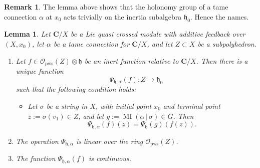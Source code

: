 \documentclass[10pt, a4paper]{amsart}
\newtheorem{lem}[equation]{Lemma}
\theoremstyle{definition}
\newtheorem{rem}[equation]{Remark}
\numberwithin{equation}{section}
\newcommand{\opn}{\operatorname}
\newcommand{\mfrak}[1]{\mathfrak{#1}}
\newcommand{\mcal}[1]{\mathcal{#1}}
\newcommand{\mbf}[1]{\mathbf{#1}}
\newcommand{\mrm}[1]{\mathrm{#1}}
\renewcommand{\vert}{\, | \,}
\newcommand{\h}{\mfrak{h}}
\begin{document}
\begin{rem}
The lemma above shows that the holonomy group of a tame connection
$\alpha$ at $x_0$ acts trivially on the inertia subalgebra $\h_0$. Hence the
names.
\end{rem}

\begin{lem} \label{lem:46}
Let $\mbf{C} / X$ be a Lie quasi crossed module with additive feedback over
$(X, x_0)$, let $\alpha$ be a tame connection for $\mbf{C} / X$, and
let $Z \subset X$ be a subpolyhedron.
\begin{enumerate}
\item Let $f \in \mcal{O}_{\mrm{pws}}(Z) \otimes \h$ be an inert
function relative to $\mbf{C} / X$.
Then there is a unique function
\[ \Psi_{\h, \alpha}(f) : Z \to \h_0 \]
such that the following condition holds:
\begin{itemize}
\item[($*$)] Let $\sigma$ be a string in $X$, with initial point $x_0$
and terminal point $z := \sigma(v_1) \in Z$, and let
$g := \opn{MI}(\alpha \vert \sigma) \in G$. 
Then 
\[ \Psi_{\h, \alpha}(f)(z) = \Psi_{\h}(g)(f(z)) . \]
%
\end{itemize}
\item The operation $\Psi_{\h, \alpha}$
is linear over the ring $\mcal{O}_{\mrm{pws}}(Z)$.
%
\item The function $\Psi_{\h, \alpha}(f)$ is continuous.
\end{enumerate}
\end{lem}
\end{document}
